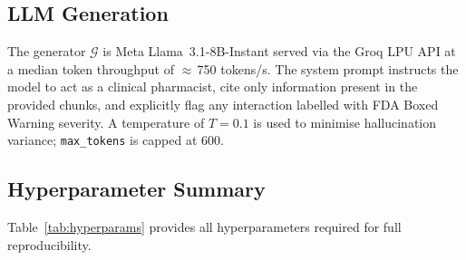 \documentclass[10pt, twocolumn]{article}
\begin{document}
\subsection{LLM Generation}
The generator $\mathcal{G}$ is Meta Llama~3.1-8B-Instant
\cite{dubey2024llama3} served via the Groq LPU API at a median token
throughput of $\approx$\,750 tokens/s.  The system prompt instructs the
model to act as a clinical pharmacist, cite only information present in
the provided chunks, and explicitly flag any interaction labelled with
FDA Boxed Warning severity.  A temperature of $T = 0.1$ is used to
minimise hallucination variance; \texttt{max\_tokens} is capped at 600.

\subsection{Hyperparameter Summary}

Table~\ref{tab:hyperparams} provides all hyperparameters required for
full reproducibility.
\end{document}
